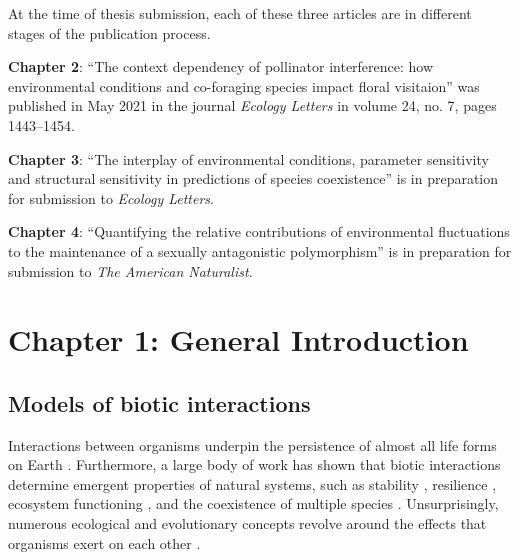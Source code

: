\documentclass[12pt]{article}
\begin{document}
At the time of thesis submission, each of these three articles are in different stages of the publication process.

\textbf{Chapter 2}: ``The context dependency of pollinator interference: how environmental conditions and co-foraging species impact floral visitaion'' was published in May 2021 in the journal \textit{Ecology Letters} in volume 24, no. 7, pages 1443--1454.

\textbf{Chapter 3}: ``The interplay of environmental conditions, parameter sensitivity and structural sensitivity in predictions of species coexistence'' is in preparation for submission to \textit{Ecology Letters}.

\textbf{Chapter 4}: ``Quantifying the relative contributions of environmental fluctuations to the maintenance of a sexually antagonistic polymorphism'' is in preparation for submission to \textit{The American Naturalist}.

\clearpage
\section*{Chapter 1: General Introduction}

\subsection*{Models of biotic interactions}
Interactions between organisms underpin the persistence of almost all life forms on Earth \citep{lawton1999there}. Furthermore, a large body of work has shown that biotic interactions determine emergent properties of natural systems, such as stability \citep{may1972will, wootton2016many,song2018will}, resilience \citep{capdevila2021reconciling}, ecosystem functioning \citep{turnbull2013coexistence,godoy2020excess}, and the coexistence of multiple species \citep{chesson2000mechanisms,saavedra2017structural}. Unsurprisingly, numerous ecological and evolutionary concepts revolve around the effects that organisms exert on each other \citep{gause_experimental_1934,macarthur1967limiting,thompson1999evolution, hillerislambers2012rethinking, chase2009ecological}.
\end{document}
